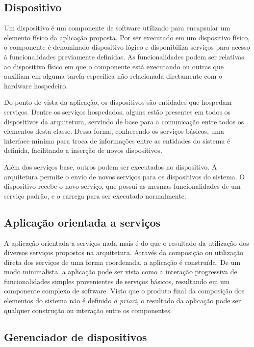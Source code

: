 \subsection{Dispositivo}

Um dispositivo é um componente de software utilizado para encapsular um elemento físico da aplicação
proposta. Por ser executado em um dispositivo físico, o componente é denominado dispositivo lógico e
disponibiliza serviços para acesso à funcionalidades previamente definidas. As funcionalidades podem
ser relativas ao dispositivo físico em que o componente está executando ou outras que auxiliam em
alguma tarefa específica não relacionada diretamente com o hardware hospedeiro.

Do ponto de vista da aplicação, os dispositivos são entidades que hospedam serviços. Dentre os
serviços hospedados, alguns estão presentes em todos os dispositivos da arquitetura, servindo de
base para a comunicação entre todos os elementos desta classe. Dessa forma, conhecendo os serviços
básicos, uma interface mínima para troca de informações entre as entidades do sistema é definida,
facilitando a inserção de novos dispositivos.

Além dos serviços base, outros podem ser executados no dispositivo. A arquitetura permite o envio de
novos serviços para os dispositivos do sistema. O dispositivo recebe o novo serviço, que possui as
mesmas funcionalidades de um serviço padrão, e o carrega para ser executado normalmente.


\subsection{Aplicação orientada a serviços}

A aplicação orientada a serviços
nada mais é do que o resultado da utilização dos diversos serviços propostos na arquitetura. Através
da composição ou utilização direta dos serviços de uma forma coordenada, a aplicação é construída.
De um modo minimalista, a aplicação pode ser vista como a interação progressiva de funcionalidades
simples provenientes de serviços básicos, resultando em um componente complexo de software. Visto
que o produto final da composição dos elementos do sistema não é definido \textit{a priori}, o
resultado da aplicação pode ser qualquer construção ou interação entre os componentes.


\subsection{Gerenciador de dispositivos}

